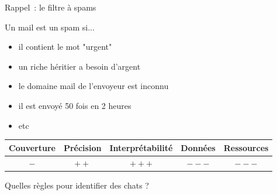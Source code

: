 \documentclass[serif, aspectratio=169]{beamer}
\begin{document}
\begin{frame}{Rappel~: le filtre à spams}
    \begin{block}{Un mail est un spam si...}
        \begin{itemize}
            \item il contient le mot "urgent"
            \item un riche héritier a besoin d'argent
            \item le domaine mail de l'envoyeur est inconnu
            \item il est envoyé 50 fois en 2 heures
            \item etc
        \end{itemize}
    \end{block}
    \vfill
    \begin{table}
        \centering
        \renewcommand{\arraystretch}{1.5}  
        \begin{tabular}{|c|c|c|c|c|}
            \hline
            Couverture & Précision & Interprétabilité & Données & Ressources \\
            \hline
            $-$        & $++$      & $+++$            & $---$   & $---$      \\
            \hline
        \end{tabular}
    \end{table}
\end{frame}

\begin{exoframe}
    \begin{center}
        \Large
        Quelles règles pour identifier des chats ?
    \end{center}
\end{exoframe}
\end{document}

